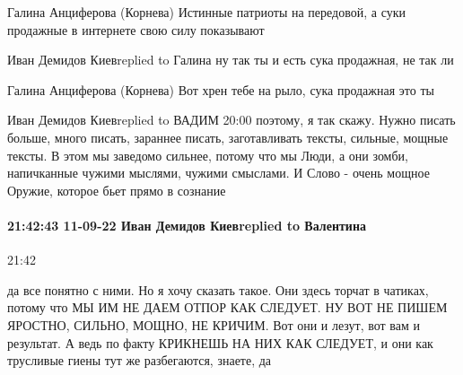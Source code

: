 Галина Анциферова (Корнева)
Истинные патриоты на передовой, а суки продажные в интернете свою силу показывают

Иван Демидов Киевreplied to Галина
ну так ты и есть сука продажная, не так ли

Галина Анциферова (Корнева)
Вот хрен тебе на рыло, сука продажная это ты

Иван Демидов Киевreplied to ВАДИМ
20:00
поэтому, я так скажу. Нужно писать больше, много писать, зараннее писать, заготавливать тексты, сильные, мощные тексты. В этом мы заведомо сильнее, потому что мы Люди, а они зомби, напичканные чужими мыслями, чужими смыслами. И Слово - очень мощное Оружие, которое бьет прямо в сознание

\paragraph{21:42:43 11-09-22 Иван Демидов Киевreplied to Валентина}
21:42

да все понятно с ними. Но я хочу сказать такое. Они здесь торчат в чатиках,
потому что МЫ ИМ НЕ ДАЕМ ОТПОР КАК СЛЕДУЕТ. НУ ВОТ НЕ ПИШЕМ ЯРОСТНО, СИЛЬНО,
МОЩНО, НЕ КРИЧИМ. Вот они и лезут, вот вам и результат. А ведь по факту
КРИКНЕШЬ НА НИХ КАК СЛЕДУЕТ, и они как трусливые гиены тут же разбегаются,
знаете, да
